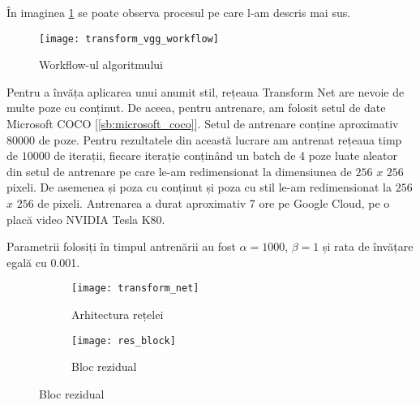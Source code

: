În imaginea \ref{fig:transform_vgg_workflow} se poate observa procesul pe care l-am descris mai sus.

\begin{figure}[H]
		\centering
        \texttt{[image: transform\_vgg\_workflow]}
        \caption{Workflow-ul algoritmului}
        \label{fig:transform_vgg_workflow}
\end{figure}

Pentru a învăța aplicarea unui anumit stil, rețeaua Transform Net are nevoie de multe poze cu conținut. De aceea, pentru antrenare, am folosit setul de date Microsoft COCO [\ref{sb:microsoft_coco}]. Setul de antrenare conține aproximativ $80000$ de poze. Pentru rezultatele din această lucrare am antrenat rețeaua timp de $10000$ de iterații, fiecare iterație conținând un batch de 4 poze luate aleator din setul de antrenare pe care le-am redimensionat la dimensiunea de $256$ $x$ $256$ pixeli. De asemenea și poza cu conținut și poza cu stil le-am redimensionat la $256$ $x$ $256$ de pixeli. Antrenarea a durat aproximativ 7 ore pe Google Cloud, pe o placă video NVIDIA Tesla K80.

Parametrii folosiți în timpul antrenării au fost $\alpha = 1000$, $\beta = 1$ și rata de învățare egală cu 0.001.

\begin{figure}[h]
	\centering
    \begin{subfigure}[b]{0.4\textwidth}
		\centering
        \texttt{[image: transform\_net]}
        \caption{Arhitectura rețelei \cite{johnson2016_supp}}
        \label{fig:transform_net_arh}
	\end{subfigure}
    \hfill
    \begin{subfigure}[b]{0.4\textwidth}
		\centering
        \texttt{[image: res\_block]}
        \caption{Bloc rezidual \cite{johnson2016_supp}}
        \label{fig:res_block}
	\end{subfigure}
\end{figure}

